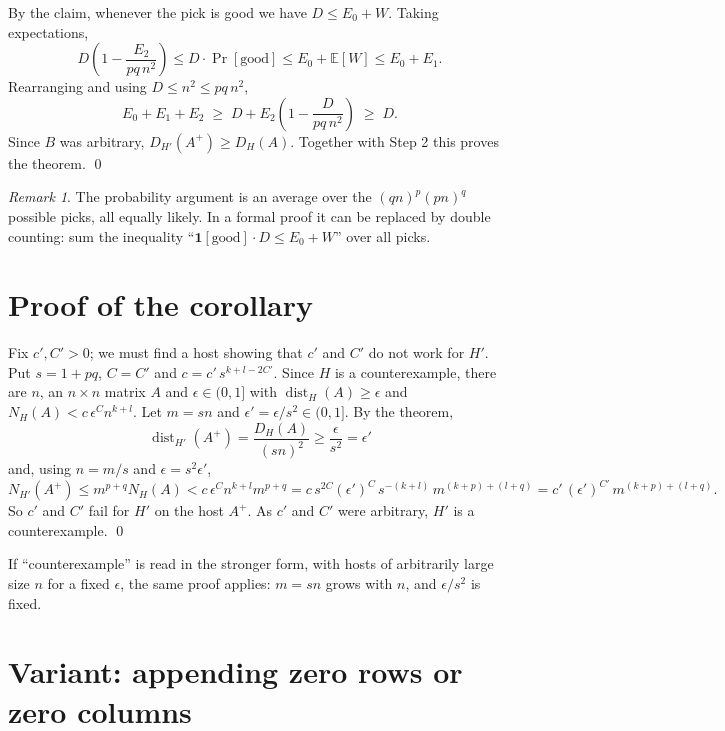 \documentclass[11pt]{article}
\DeclareMathOperator{\dist}{dist}
\theoremstyle{plain}
\theoremstyle{definition}
\theoremstyle{remark}
\newtheorem{remark}[theorem]{Remark}
\begin{document}
By the claim, whenever the pick is good we have $D \le E_0 + W$. Taking expectations,
\[
D \left(1 - \frac{E_2}{pq\,n^2}\right) \le D \cdot \Pr[\text{good}] \le E_0 + \mathbb{E}[W]
\le E_0 + E_1 .
\]
Rearranging and using $D \le n^2 \le pq\,n^2$,
\[
E_0 + E_1 + E_2 \;\ge\; D + E_2\left(1 - \frac{D}{pq\,n^2}\right) \;\ge\; D .
\]
Since $B$ was arbitrary, $D_{H'}(A^+) \ge D_H(A)$. Together with Step 2 this proves the
theorem. \qed

\begin{remark}
The probability argument is an average over the $(qn)^p (pn)^q$ possible picks, all equally
likely. In a formal proof it can be replaced by double counting: sum the inequality
``$\mathbf{1}[\text{good}]\cdot D \le E_0 + W$'' over all picks.
\end{remark}

\section{Proof of the corollary}

Fix $c', C' > 0$; we must find a host showing that $c'$ and $C'$ do not work for $H'$. Put
$s = 1 + pq$, $C = C'$ and $c = c'\, s^{k+l-2C'}$. Since $H$ is a counterexample, there are $n$, an $n \times n$ matrix $A$
and $\epsilon \in (0,1]$ with $\dist_H(A) \ge \epsilon$ and $N_H(A) < c\,\epsilon^C n^{k+l}$.
Let $m = sn$ and $\epsilon' = \epsilon/s^2 \in (0,1]$. By the theorem,
\[
\dist_{H'}(A^+) = \frac{D_H(A)}{(sn)^2} \ge \frac{\epsilon}{s^2} = \epsilon'
\]
and, using $n = m/s$ and $\epsilon = s^2 \epsilon'$,
\[
N_{H'}(A^+) \le m^{p+q} N_H(A) < c\,\epsilon^{C} n^{k+l} m^{p+q}
= c\, s^{2C}(\epsilon')^{C}\, s^{-(k+l)}\, m^{(k+p)+(l+q)}
= c'\,(\epsilon')^{C'}\, m^{(k+p)+(l+q)} .
\]
So $c'$ and $C'$ fail for $H'$ on the host $A^+$. As $c'$ and $C'$ were arbitrary, $H'$ is a
counterexample. \qed

\medskip
If ``counterexample'' is read in the stronger form, with hosts of arbitrarily large size $n$
for a fixed $\epsilon$, the same proof applies: $m = sn$ grows with $n$, and $\epsilon/s^2$ is
fixed.

\section{Variant: appending zero rows or zero columns}
\end{document}
